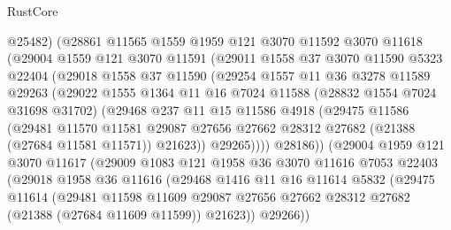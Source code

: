 \begin{lexlean}{RustCore}
\begin{coremodule}
            @25482)
          (@28861
            @11565
            @1559
            @1959
            @121
            @3070
            @11592
            @3070
            @11618
            (@29004
              @1559
              @121
              @3070
              @11591
              (@29011
                @1558
                @37
                @3070
                @11590
                @5323
                @22404
                (@29018
                  @1558
                  @37
                  @11590
                  (@29254
                    @1557
                    @11
                    @36
                    @3278
                    @11589
                    @29263
                    (@29022
                      @1555
                      @1364
                      @11
                      @16
                      @7024
                      @11588
                      (@28832 @1554 @7024 @31698 @31702)
                      (@29468
                        @237
                        @11
                        @15
                        @11586
                        @4918
                        (@29475
                          @11586
                          (@29481
                            @11570
                            @11581
                            @29087
                            @27656
                            @27662
                            @28312
                            @27682
                            (@21388 (@27684 @11581 @11571))
                            @21623))
                        @29265))))
                @28186))
            (@29004
              @1959
              @121
              @3070
              @11617
              (@29009
                @1083
                @121
                @1958
                @36
                @3070
                @11616
                @7053
                @22403
                (@29018
                  @1958
                  @36
                  @11616
                  (@29468
                    @1416
                    @11
                    @16
                    @11614
                    @5832
                    (@29475
                      @11614
                      (@29481
                        @11598
                        @11609
                        @29087
                        @27656
                        @27662
                        @28312
                        @27682
                        (@21388 (@27684 @11609 @11599))
                        @21623))
                    @29266))

\end{coremodule}
\end{lexlean}
